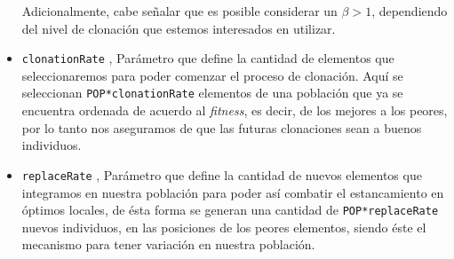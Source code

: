 \begin{itemize}
			Adicionalmente, cabe señalar que es posible considerar un $\beta > 1$, dependiendo del nivel
			de clonación que estemos interesados en utilizar.

	\item \texttt{clonationRate}   \blue{[0,1]}, Parámetro que define la cantidad de elementos que seleccionaremos
			para poder comenzar el proceso de clonación. Aquí se seleccionan \texttt{POP*clonationRate} elementos
			de una población que ya se encuentra ordenada de acuerdo al \emph{fitness}, es decir, de los mejores
			a los peores, por lo tanto nos aseguramos de que las futuras clonaciones sean a buenos individuos.

	\item \texttt{replaceRate}     \blue{[0,1]}, Parámetro que define la cantidad de nuevos elementos que
			integramos en nuestra población para poder así combatir el estancamiento en óptimos locales,
			de ésta forma se generan una cantidad de \texttt{POP*replaceRate} nuevos individuos, en las posiciones
			de los peores elementos, siendo éste el mecanismo para tener variación en nuestra población.

\end{itemize}
